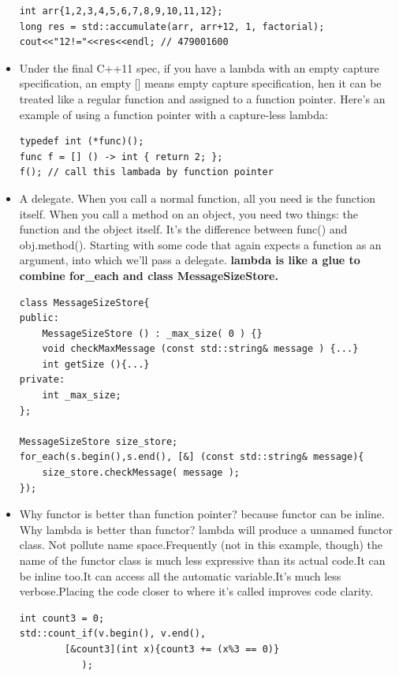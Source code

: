 \documentclass[a4paper,11pt,twoside]{book}
\begin{document}
\begin{itemize}
\begin{lstlisting}[numbers=none]
int arr{1,2,3,4,5,6,7,8,9,10,11,12};
long res = std::accumulate(arr, arr+12, 1, factorial);
cout<<"12!="<<res<<endl; // 479001600
\end{lstlisting}

		\item Under the final C++11 spec, if you have a lambda with an empty capture specification, an empty [] means empty capture specification, hen it can be treated like a regular function and assigned to a function pointer. Here's an example of using a function pointer with a capture-less lambda:

\begin{lstlisting}[numbers=none]
typedef int (*func)();
func f = [] () -> int { return 2; };
f(); // call this lambada by function pointer
\end{lstlisting}


\item A delegate. When you call a normal function, all you need is the function itself. When you call a method on an object, you need two things: the function and the object itself. It's the difference between func() and obj.method(). Starting with some code that again expects a function as an argument, into which we'll pass a delegate. \textbf{lambda is like a glue to combine for\_each and class MessageSizeStore.}

\begin{lstlisting}[numbers=none]
class MessageSizeStore{
public:
    MessageSizeStore () : _max_size( 0 ) {}
    void checkMaxMessage (const std::string& message ) {...}
    int getSize (){...}
private:
    int _max_size;
};

MessageSizeStore size_store;
for_each(s.begin(),s.end(), [&] (const std::string& message){
	size_store.checkMessage( message );
});
\end{lstlisting}

\item Why functor is better than function pointer? because functor can be inline. Why lambda is better than functor? lambda will produce a unnamed functor class. Not pollute name space.Frequently (not in this example, though) the name of the functor class is much less expressive than its actual code.It can be inline too.It can access all the automatic variable.It's much less verbose.Placing the code closer to where it's called improves code clarity.
\begin{lstlisting}[numbers=none]
int count3 = 0;
std::count_if(v.begin(), v.end(), 
		[&count3](int x){count3 += (x%3 == 0)} 
		   );
\end{lstlisting}

\end{itemize}
\end{document}
